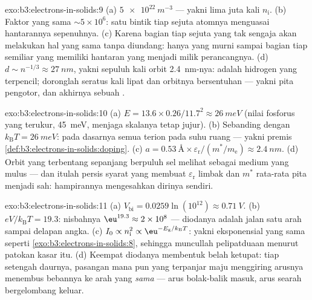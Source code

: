 \begin{solution}{exo:b3:electrons-in-solids:9}
(a) $\qty{5e22}{m^{-3}}$ --- yakni lima juta kali $n_{\text{i}}$.
(b) Faktor yang sama $\sim5\times10^6$: satu bintik tiap sejuta
atomnya menguasai hantarannya sepenuhnya. (c) Karena bagian tiap sejuta
yang tak sengaja akan melakukan hal yang sama tanpa diundang: hanya 
yang murni sampai bagian tiap semiliar yang memiliki hantaran yang menjadi
milik perancangnya. (d) $d \sim n^{-1/3}
\approx \qty{27}{nm}$, yakni sepuluh kali orbit \qty{2.4}{nm}-nya: 
adalah hidrogen yang terpencil; doronglah  seratus kali lipat dan
orbitnya bersentuhan --- yakni pita pengotor, dan akhirnya sebuah .
\end{solution}

\begin{solution}{exo:b3:electrons-in-solids:10}
(a) $E = 13.6\times0.26/11.7^2 \approx \qty{26}{meV}$ (nilai
fosforus yang terukur, \qty{45}{meV}, menjaga skalanya tetap
jujur). (b) Sebanding dengan $k_{\text{B}}T = \qty{26}{meV}$:
pada dasarnya semua  terion pada suhu ruang --- yakni
premis \cref{def:b3:electrons-in-solids:doping}. (c) $a =
\qty{0.53}{\angstrom}\times\varepsilon_{\text{r}}/(m^*/
m_{\text{e}}) \approx \qty{2.4}{nm}$. (d) Orbit yang terbentang sepanjang
berpuluh sel melihat  sebagai medium yang mulus --- dan itulah
persis syarat yang membuat $\varepsilon_{\text{r}}$ limbak dan $m^*$
rata-rata pita menjadi sah:
hampirannya mengesahkan dirinya sendiri.
\end{solution}

\begin{solution}{exo:b3:electrons-in-solids:11}
(a) $V_{\text{bi}} = 0.0259\ln(10^{12}) \approx \qty{0.71}{V}$.
(b) $eV/k_{\text{B}}T = 19.3$: nisbahnya $\eu^{19.3} \approx
2\times10^{8}$ --- diodanya adalah jalan satu arah sampai delapan
angka. (c) $I_0 \propto n_{\text{i}}^2 \propto
\eu^{-E_{\text{g}}/k_{\text{B}}T}$: yakni eksponensial yang sama seperti
\cref{exo:b3:electrons-in-solids:8}, sehingga muncullah
pelipatduaan menurut patokan kasar itu. (d) Keempat diodanya membentuk
belah ketupat: tiap setengah daurnya, pasangan mana pun yang terpanjar maju
menggiring arusnya menembus bebannya ke arah yang \emph{sama} --- arus
bolak-balik masuk, arus searah bergelombang keluar.
\end{solution}

